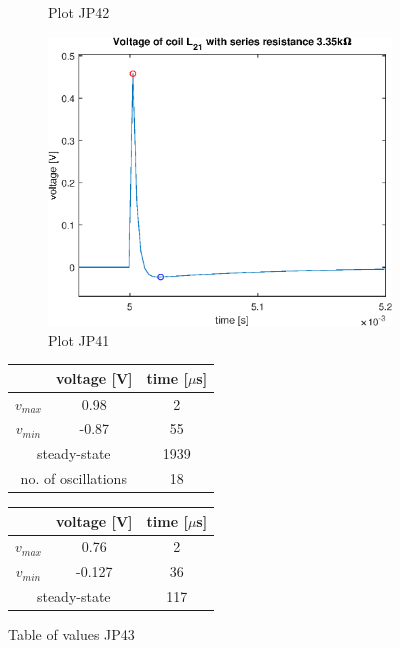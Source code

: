 \documentclass[notitlepage, a4paper, 11pt]{article}
\begin{document}
\begin{figure}[H]
\begin{subfigure}{0.3 \textwidth}
			\caption{Plot JP42}
		\end{subfigure}
		\hfill
		\begin{subfigure}{0.3 \textwidth}
			\includegraphics[width=\textwidth]{../Matlab/img/CircuitC1}
			\caption{Plot JP41}
		\end{subfigure}
				\hfill
		\begin{subtable}{0.3 \textwidth}
			\centering
			\begin{tabular}{|c|c|c|}
				\hline
				& voltage [V] & time [$\mu$s] \\
				\hline
				$v_{max}$ & 0.98 & 2 \\
				\hline
				$v_{min}$ & -0.87 & 55 \\
				\hline
				\multicolumn{2}{|c|}{ steady-state} & 1939 \\
				\hline \hline
				\multicolumn{2}{|c|}{no. of oscillations} & 18 \\
				\hline
			\end{tabular}
			\caption{Table of values JP43}
		\end{subtable}
		\hfill
		\begin{subtable}{0.3 \textwidth}
			\centering
			\begin{tabular}{|c|c|c|}
	\hline
	& voltage [V] & time [$\mu$s] \\
	\hline
	$v_{max}$ & 0.76 & 2 \\
	\hline
	$v_{min}$ & -0.127 & 36\\
	\hline
	\multicolumn{2}{|c|}{ steady-state} & 117 \\

\end{tabular}
\end{subtable}
\end{figure}
\end{document}
